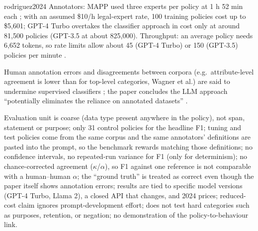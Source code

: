 \begin{papercard}{rodriguez2024}
 Annotators: MAPP used three experts per policy at 1 h 52 min each ; with an assumed \$10/h legal-expert rate, 100 training policies cost up to \$5,601; GPT-4 Turbo overtakes the classifier approach in cost only at around 81,500 policies (GPT-3.5 at about 825,000). Throughput: an average policy needs 6,652 tokens, so rate limits allow about 45 (GPT-4 Turbo) or 150 (GPT-3.5) policies per minute .

 Human annotation errors and disagreements between corpora (e.g.\ attribute-level agreement is lower than for top-level categories, Wagner et al.) are said to undermine supervised classifiers ; the paper concludes the LLM approach ``potentially eliminates the reliance on annotated datasets'' .

 Evaluation unit is coarse (data type present anywhere in the policy), not span, statement or purpose; only 31 control policies for the headline F1; tuning and test policies come from the same corpus and the same annotators' definitions are pasted into the prompt, so the benchmark rewards matching those definitions; no confidence intervals, no repeated-run variance for F1 (only for determinism); no chance-corrected agreement ($\kappa$/$\alpha$), so F1 against one reference is not comparable with a human--human $\alpha$; the ``ground truth'' is treated as correct even though the paper itself shows annotation errors; results are tied to specific model versions (GPT-4 Turbo, Llama 2), a closed API that changes, and 2024 prices; reduced-cost claim ignores prompt-development effort; does not test hard categories such as purposes, retention, or negation; no demonstration of the policy-to-behaviour link.


\end{papercard}
